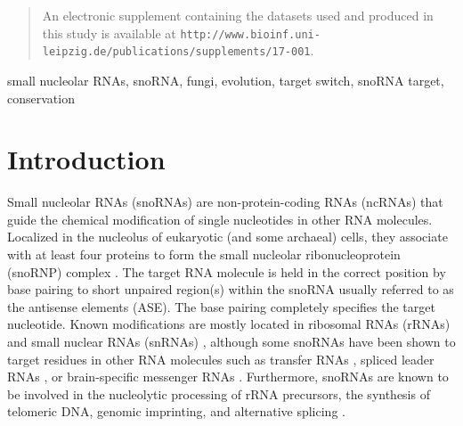 \documentclass[preprint,3p,times]{elsarticle}
\newcommand{\url}[1]{\texttt{\small #1}}
\newcommand{\sno}{snoRNA}
\begin{document}
\begin{frontmatter}
\begin{abstract}
  An electronic supplement containing the datasets used and produced in
  this study is available at
  \url{http://www.bioinf.uni-leipzig.de/publications/supplements/17-001}. 
\end{abstract}

\begin{keyword}
  small nucleolar RNAs, snoRNA, fungi, evolution, target switch, snoRNA target, 	
  conservation	
\end{keyword}

\end{frontmatter}


\section{Introduction}

Small nucleolar RNAs (snoRNAs) are non-protein-coding RNAs (ncRNAs) that
guide the chemical modification of single nucleotides in other RNA
molecules.  Localized in the nucleolus of eukaryotic (and some archaeal)
cells, they associate with at least four proteins to form the small
nucleolar ribonucleoprotein (snoRNP) complex \cite{Reichow:2007}.  The
target RNA molecule is held in the correct position by base pairing to
short unpaired region(s) within the snoRNA usually referred to as the
antisense elements (ASE). The base pairing completely specifies the target
nucleotide. Known modifications are mostly located in ribosomal RNAs
(rRNAs) and small nuclear RNAs (snRNAs)
\cite{Decatur:2002,Darzacq:2002,Bratkovi:2011}, although some snoRNAs have
been shown to target residues in other RNA molecules such as transfer RNAs
\cite{Clouet_d'Orval:2001,Dennis:2001}, spliced leader RNAs
\cite{Uliel:2004}, or brain-specific messenger RNAs \cite{Cavaillé:2000,
  Kishore:2006}. Furthermore, {\sno}s are known to be involved in the
nucleolytic processing of rRNA precursors, the synthesis of telomeric DNA,
genomic imprinting, and alternative splicing
\cite{Maxwell:1995,Tollervey:1997,Kiss:2002,Matera:2007}.
\end{document}
